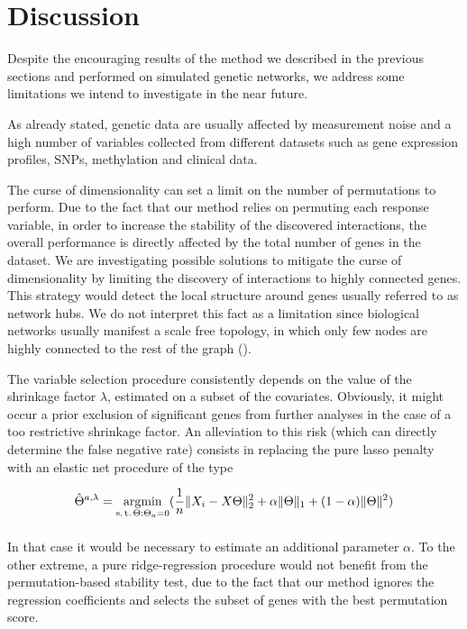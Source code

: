 \section{Discussion} \label{discussion}
Despite the encouraging results of the method we described in the previous sections and performed on simulated genetic networks, we address some limitations we intend to investigate in the near future. 

As already stated, genetic data are usually affected by measurement noise and a high number of variables collected from different datasets such as gene expression profiles, SNPs, methylation and clinical data. 

The curse of dimensionality can set a limit on the number of permutations to perform. Due to the fact that our method relies on permuting each response variable, in order to increase the stability of the discovered interactions, the overall performance is directly affected by the total number of genes in the dataset. 
We are investigating possible solutions to mitigate the curse of dimensionality by limiting the discovery of interactions to highly connected genes. This strategy would detect the local structure around genes usually referred to as network hubs. We do not interpret this fact as a limitation since biological networks usually manifest a scale free topology, in which only few nodes are highly connected to the rest of the graph (\citealp{BAR03a, evidencescalefree}). 

The variable selection procedure consistently depends on the value of the shrinkage factor $\lambda$, estimated on a subset of the covariates. Obviously, it might occur a prior exclusion of significant genes from further analyses in the case of a too restrictive shrinkage factor. An alleviation to this risk (which can  directly determine the false negative rate) consists in replacing the pure lasso penalty with an elastic net procedure of the type

\begin{equation}
\label{eq:elnet}
    \hat{\Theta}^{a,\lambda} = 
    \argmin_{%
      \substack{%
        \text{s.\,t.}\, \Theta:\Theta_a = 0 \\
        \phantom{}\, 
      }
    }
    (\frac{1}{n} \| X_i - X\Theta \|^{2}_2 + \alpha \| \Theta \|_{1} + (1-\alpha) \| \Theta \|^{2})
  \end{equation}
   

In that case it would be necessary to estimate an additional parameter $\alpha$. To the other extreme, a pure ridge-regression procedure would not benefit from the permutation-based stability test, due to the fact that our method ignores the regression coefficients and selects the subset of genes with the best permutation score. 

